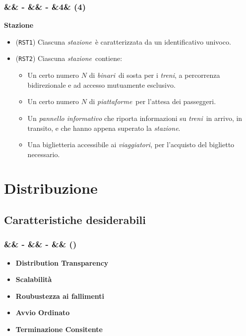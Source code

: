 \documentclass[slidestop,compress,blackandwhite]{beamer}
\newcommand{\itemB}[3]{
	\item \textbf{#1} #2 \vspace{#3}
}
\newcommand{\ttt}[1]{\texttt{#1}}
\newcommand{\ii}[1]{\textit{#1}}
\newcommand{\treni}{\ii{treni}}
\newcommand{\viaggiatori}{\ii{viaggiatori}}
\newcommand{\stazione}{\ii{stazione}}
\newcommand{\piattaforme}{\ii{piattaforme}}
\newcommand{\binari}{\ii{binari}}
\newcommand{\newtitle}[4]{
	#1 
	\ifx&#2&%
	\else
  		\large- #2
	\fi
	\ifx&#3&%
	\else
  		\normalsize- #3
	\fi
	\ifx&#4&%
	\else
  		\normalsize (#4)
	\fi
}
\newcommand{\newframe}[5]{
	\begin{frame}
		\frametitle{\newtitle{#1}{#2}{#3}{#4}}
		#5
	\end{frame}
}
\newcommand{\itemt}[1]{\item (\ttt{#1})}
\begin{document}
	\newframe{}{}{}{4}{
		\vspace{0.5cm}
		\textbf{Stazione}
		\begin{itemize}
			\itemt{RST1} Ciascuna \stazione~è caratterizzata da un identificativo univoco.
			\itemt{RST2} Ciascuna \stazione~contiene:
				\begin{itemize}
					\item Un certo numero $N$ di \binari~di sosta per i \treni, a percorrenza bidirezionale e ad accesso mutuamente esclusivo.
					\item Un certo numero $N$ di \piattaforme~per l'attesa dei passeggeri.
					\item Un \ii{pannello informativo} che riporta informazioni su \treni~in arrivo, in transito, e che hanno appena superato la \stazione.
					\item Una biglietteria accessibile ai \viaggiatori, per l'acquisto del biglietto necessario.
				\end{itemize}
		\end{itemize} 
	}


	\section{Distribuzione}
	
	\subsection{Caratteristiche desiderabili}\label{characteristics}
	\newframe{}{}{}{}{
		\begin{itemize}
			\itemB{Distribution Transparency}{}{1cm}
			\itemB{Scalabilità}{}{1cm} 
			\itemB{Roubustezza ai fallimenti}{}{1cm} 
			\itemB{Avvio Ordinato}{}{1cm} 
			\itemB{Terminazione Consitente}{}{1cm} 
		\end{itemize}
	}
	
		
%		
%		
%	
%	
\end{document}
